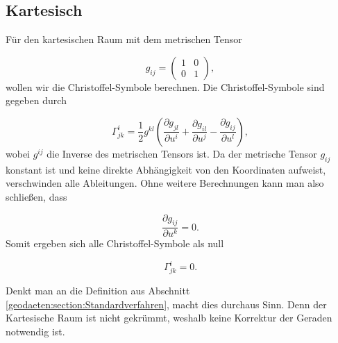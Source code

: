 %
%
%
%
\subsection{Kartesisch\label{geodaeten:section:Standardverfahren:Kartesisch}}

Für den kartesischen Raum mit dem metrischen Tensor
 
\begin{equation}
g_{ij} = \begin{pmatrix} 
	1 & 0 \\ 
	0 & 1 
\end{pmatrix},
\end{equation}
wollen wir die Christoffel-Symbole berechnen.
Die Christoffel-Symbole sind gegeben durch

\begin{equation}
\Gamma^i_{jk} = \frac{1}{2} g^{kl} \left( \frac{\partial g_{jl}}{\partial u^i} + \frac{\partial g_{il}}{\partial u^j} - \frac{\partial g_{ij}}{\partial u^l} \right),
\end{equation}
wobei $g^{ij}$ die Inverse des metrischen Tensors ist.
Da der metrische Tensor $g_{ij}$ konstant ist und keine direkte Abhängigkeit von den Koordinaten aufweist, verschwinden alle Ableitungen.
Ohne weitere Berechnungen kann man also schließen, dass

\begin{equation}
\frac{\partial g_{ij}}{\partial u^k} = 0 .
\end{equation}
Somit ergeben sich alle Christoffel-Symbole als null

\begin{equation}
\Gamma^i_{jk} = 0 .
\end{equation}

Denkt man an die Definition aus Abschnitt \ref{geodaeten:section:Standardverfahren}, macht dies durchaus Sinn.
Denn der Kartesische Raum ist nicht gekrümmt, weshalb keine Korrektur der Geraden notwendig ist.

